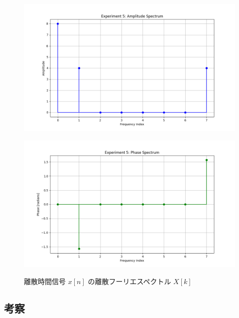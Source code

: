 \documentclass[fleqn, a4paper. 12pt]{jsarticle}
\begin{document}
  \begin{figure}[h]
    \begin{center}
    \begin{minipage}[t]{0.48\columnwidth}
        \includegraphics[width=\columnwidth]{amplitude_spectrum_experiment_5.png}
        \label{fign:a5}
    \end{minipage}
    \begin{minipage}[t]{0.48\columnwidth}
        \includegraphics[width=\columnwidth]{phase_spectrum_experiment_5.png}
        \label{fign:p5}
    \end{minipage}
    \end{center}
    \caption{離散時間信号 $x[n]$ の離散フーリエスペクトル $X[k]$}
  \end{figure}

  \subsection*{考察}
\end{document}
